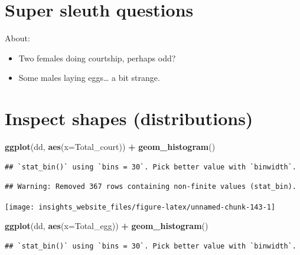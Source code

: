 \documentclass[]{book}
\newenvironment{Shaded}{\begin{snugshade}}{\end{snugshade}}
\newcommand{\DataTypeTok}[1]{\textcolor[rgb]{0.13,0.29,0.53}{#1}}
\newcommand{\KeywordTok}[1]{\textcolor[rgb]{0.13,0.29,0.53}{\textbf{#1}}}
\newcommand{\NormalTok}[1]{#1}
\newcommand{\OperatorTok}[1]{\textcolor[rgb]{0.81,0.36,0.00}{\textbf{#1}}}
\newcommand{\StringTok}[1]{\textcolor[rgb]{0.31,0.60,0.02}{#1}}
\providecommand{\tightlist}{%
  \setlength{\itemsep}{0pt}\setlength{\parskip}{0pt}}
\begin{document}
\hypertarget{super-sleuth-questions}{%
\section{Super sleuth questions}\label{super-sleuth-questions}}

About:

\begin{itemize}
\tightlist
\item
  Two females doing courtship, perhaps odd?
\item
  Some males laying eggs\ldots{} a bit strange.
\end{itemize}

\hypertarget{inspect-shapes-distributions}{%
\section{Inspect shapes (distributions)}\label{inspect-shapes-distributions}}

\begin{Shaded}
\begin{Highlighting}[]
\KeywordTok{ggplot}\NormalTok{(dd, }\KeywordTok{aes}\NormalTok{(}\DataTypeTok{x=}\NormalTok{Total_court)) }\OperatorTok{+}
\StringTok{  }\KeywordTok{geom_histogram}\NormalTok{()}
\end{Highlighting}
\end{Shaded}

\begin{verbatim}
## `stat_bin()` using `bins = 30`. Pick better value with `binwidth`.
\end{verbatim}

\begin{verbatim}
## Warning: Removed 367 rows containing non-finite values (stat_bin).
\end{verbatim}

\begin{center}\texttt{[image: insights\_website\_files/figure-latex/unnamed-chunk-143-1]} \end{center}

\begin{Shaded}
\begin{Highlighting}[]
\KeywordTok{ggplot}\NormalTok{(dd, }\KeywordTok{aes}\NormalTok{(}\DataTypeTok{x=}\NormalTok{Total_egg)) }\OperatorTok{+}
\StringTok{  }\KeywordTok{geom_histogram}\NormalTok{()}
\end{Highlighting}
\end{Shaded}

\begin{verbatim}
## `stat_bin()` using `bins = 30`. Pick better value with `binwidth`.
\end{verbatim}
\end{document}
